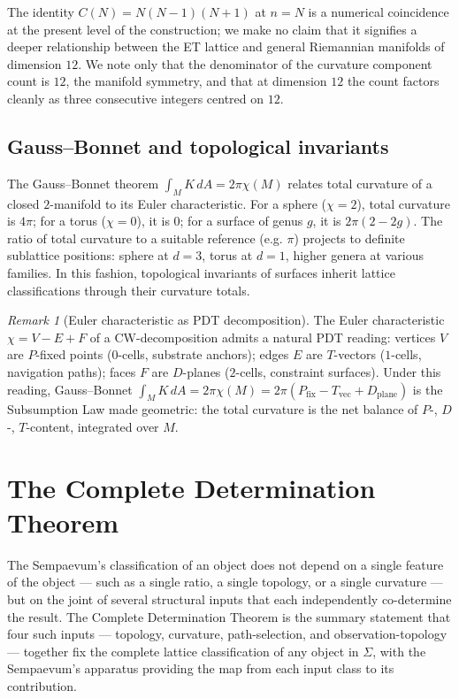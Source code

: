 \documentclass[11pt,a4paper]{article}
\theoremstyle{definition}
\theoremstyle{remark}
\newtheorem{remark}[theorem]{Remark}
\begin{document}
The identity $C(N) = N(N-1)(N+1)$ at $n=N$ is a numerical coincidence at the present level of the construction; we make no claim that it signifies a deeper relationship between the ET lattice and general Riemannian manifolds of dimension $12$. We note only that the denominator of the curvature component count is $12$, the manifold symmetry, and that at dimension $12$ the count factors cleanly as three consecutive integers centred on $12$.

\subsection{Gauss--Bonnet and topological invariants}

The Gauss--Bonnet theorem $\int_{M}K\,dA = 2\pi\chi(M)$ relates total curvature of a closed $2$-manifold to its Euler characteristic. For a sphere ($\chi=2$), total curvature is $4\pi$; for a torus ($\chi=0$), it is $0$; for a surface of genus $g$, it is $2\pi(2-2g)$. The ratio of total curvature to a suitable reference (e.g. $\pi$) projects to definite sublattice positions: sphere at $d=3$, torus at $d=1$, higher genera at various families. In this fashion, topological invariants of surfaces inherit lattice classifications through their curvature totals.

\begin{remark}[Euler characteristic as PDT decomposition]
The Euler characteristic $\chi = V - E + F$ of a CW-decomposition admits a natural PDT reading: vertices $V$ are $P$-fixed points ($0$-cells, substrate anchors); edges $E$ are $T$-vectors ($1$-cells, navigation paths); faces $F$ are $D$-planes ($2$-cells, constraint surfaces). Under this reading, Gauss--Bonnet $\int_{M} K\,dA = 2\pi\chi(M) = 2\pi(P_{\text{fix}} - T_{\text{vec}} + D_{\text{plane}})$ is the Subsumption Law made geometric: the total curvature is the net balance of $P$-, $D$-, $T$-content, integrated over $M$.
\end{remark}

\section{The Complete Determination Theorem}\label{sec:secret26}

The Sempaevum's classification of an object does not depend on a single feature of the object --- such as a single ratio, a single topology, or a single curvature --- but on the joint of several structural inputs that each independently co-determine the result. The Complete Determination Theorem is the summary statement that four such inputs --- topology, curvature, path-selection, and observation-topology --- together fix the complete lattice classification of any object in $\Sigma$, with the Sempaevum's apparatus providing the map from each input class to its contribution.
\end{document}

